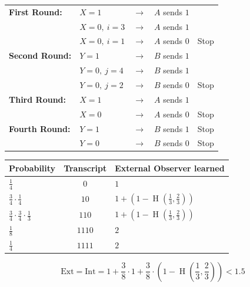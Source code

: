 \documentclass{article}
\begin{document}
\begin{center}
\renewcommand{\arraystretch}{1.3}
\begin{tabular}{l l c l l}
\textbf{First Round:}  & $X=1$            & $\to$ & $A$ sends $1$ & \\
                       & $X=0,\ i=3$      & $\to$ & $A$ sends $1$ & \\
                       & $X=0,\ i=1$      & $\to$ & $A$ sends $0$ & Stop \\
\textbf{Second Round:} & $Y=1$            & $\to$ & $B$ sends $1$ & \\
                       & $Y=0,\ j=4$      & $\to$ & $B$ sends $1$ & \\
                       & $Y=0,\ j=2$      & $\to$ & $B$ sends $0$ & Stop \\
\textbf{Third Round:}  & $X=1$            & $\to$ & $A$ sends $1$ & \\
                       & $X=0$            & $\to$ & $A$ sends $0$ & Stop \\
\textbf{Fourth Round:} & $Y=1$            & $\to$ & $B$ sends $1$ & Stop \\
                       & $Y=0$            & $\to$ & $B$ sends $0$ & Stop
\end{tabular}
\end{center}

\begin{center}
\renewcommand{\arraystretch}{1.4}
\begin{tabular}{l c l}
\textbf{Probability} & \textbf{Transcript} & \textbf{External Observer learned} \\
\hline
$\frac{1}{4}$                                        & $0$    & $1$ \\
$\frac{3}{4}\cdot\frac{1}{4}$                        & $10$   & $1 + \left(1 - \operatorname{H}\!\left(\frac{1}{3},\frac{2}{3}\right)\right)$ \\
$\frac{3}{4}\cdot\frac{3}{4}\cdot\frac{1}{3}$        & $110$  & $1 + \left(1 - \operatorname{H}\!\left(\frac{1}{3},\frac{2}{3}\right)\right)$ \\
$\frac{1}{8}$                                        & $1110$ & $2$ \\
$\frac{1}{4}$                                        & $1111$ & $2$
\end{tabular}
\end{center}

\[
\text{Ext} = \text{Int} = 1 + \frac{3}{8}\cdot 1 + \frac{3}{8}\cdot \left(1- \operatorname{H}\left(\frac{1}{3}, \frac{2}{3}\right)\right) < 1.5
\]
\end{document}
